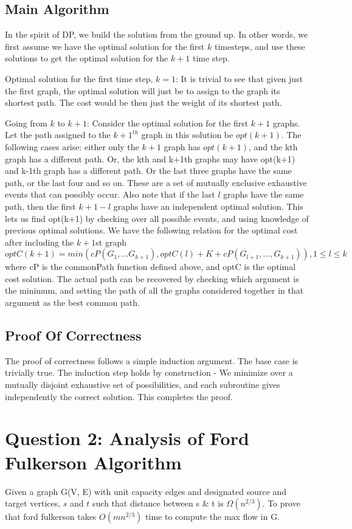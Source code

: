 \documentclass{article}
\begin{document}
\subsection{Main Algorithm}
In the spirit of DP, we build the solution from the ground up.
In other words, we first assume we have the optimal solution for the first $k$ timesteps, and use these solutions to get the optimal solution for the $k+1$ time step.
\par
Optimal solution for the first time step, $k=1$: It is trivial to see that given just the first graph, the optimal solution will just be to assign to the graph its shortest path. The cost would be then just the weight of its shortest path.
\par
Going from $k$ to $k+1$: Consider the optimal solution for the first $k+1$ graphs. Let the path assigned to the $k+1^{th}$ graph in this solution be $opt(k+1)$. The following cases arise: either only the $k+1$ graph has $opt(k+1)$, and the kth graph has a different path. Or, the kth and k+1th graphs may have opt(k+1) and k-1th graph has a different path. Or the last three graphs have the same path, or the last four and so on. These are a set of mutually exclusive exhaustive events that can possibly occur. Also note that if the last $l$ graphs have the same path, then the first $k+1-l$ graphs have an independent optimal solution. This lets us find opt(k+1) by checking over all possible events, and using knowledge of previous optimal solutions. We have the following relation for the optimal cost after including the $k+1$st graph
$$optC(k+1) = min(cP(G_{1}, \dots G_{k+1}), optC(l) + K + cP(G_{l+1}, \dots, G_{k+1})), 1 \leq l \leq k$$
where cP is the commonPath function defined above, and optC is the optimal cost solution. The actual path can be recovered by checking which argument is the minimum, and setting the path of all the graphs considered together in that argument as the best common path.
\subsection{Proof Of Correctness}
The proof of correctness follows a simple induction argument. The base case is trivially true. The induction step holds by construction - We minimize over a mutually disjoint exhaustive set of possibilities, and each subroutine gives independently the correct solution. This completes the proof.
\pagebreak

\section{Question 2: Analysis of Ford Fulkerson Algorithm}
Given a graph G(V, E) with unit capacity edges and designated source and target vertices, $s$ and $t$ such that distance between s \& t is $\Omega(n^{2/3})$. To prove that ford fulkerson takes $O(mn^{2/3})$ time to compute the max flow in G.
\end{document}
